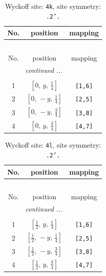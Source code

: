 \documentclass[fleqn,8pt]{jsarticle}
\begin{document}
\renewcommand{\arraystretch}{1.2}
\begin{longtable}{ccc}
\caption{Wyckoff site: {\tt 4k}, site symmetry: {\tt .2'.}}
 \\
 \hline \hline
No. & position & mapping \\ \hline \endfirsthead

\multicolumn{2}{l}{\tablename\ \thetable{}} \\
 \hline \hline
No. & position & mapping \\ \hline \endhead

 \hline \hline
\multicolumn{2}{r}{\footnotesize\it continued ...} \\ \endfoot

 \hline \hline
\multicolumn{2}{r}{} \\ \endlastfoot

1 & $\left[ 0,\, y,\, \frac{1}{4} \right]$ & {\tt [1,6]} \\ \hline
2 & $\left[ 0,\, - y,\, \frac{1}{4} \right]$ & {\tt [2,5]} \\ \hline
3 & $\left[ 0,\, - y,\, \frac{3}{4} \right]$ & {\tt [3,8]} \\ \hline
4 & $\left[ 0,\, y,\, \frac{3}{4} \right]$ & {\tt [4,7]} \\
\end{longtable}
\renewcommand{\arraystretch}{1.2}
\begin{longtable}{ccc}
\caption{Wyckoff site: {\tt 4l}, site symmetry: {\tt .2'.}}
 \\
 \hline \hline
No. & position & mapping \\ \hline \endfirsthead

\multicolumn{2}{l}{\tablename\ \thetable{}} \\
 \hline \hline
No. & position & mapping \\ \hline \endhead

 \hline \hline
\multicolumn{2}{r}{\footnotesize\it continued ...} \\ \endfoot

 \hline \hline
\multicolumn{2}{r}{} \\ \endlastfoot

1 & $\left[ \frac{1}{2},\, y,\, \frac{1}{4} \right]$ & {\tt [1,6]} \\ \hline
2 & $\left[ \frac{1}{2},\, - y,\, \frac{1}{4} \right]$ & {\tt [2,5]} \\ \hline
3 & $\left[ \frac{1}{2},\, - y,\, \frac{3}{4} \right]$ & {\tt [3,8]} \\ \hline
4 & $\left[ \frac{1}{2},\, y,\, \frac{3}{4} \right]$ & {\tt [4,7]} \\
\end{longtable}
\end{document}
